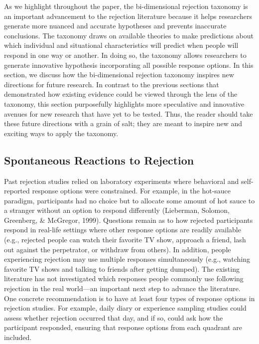 \documentclass[
]{udthesis}
\begin{document}
As we highlight throughout the paper, the bi-dimensional rejection
taxonomy is an important advancement to the rejection literature because
it helps researchers generate more nuanced and accurate hypotheses and
prevents inaccurate conclusions. The taxonomy draws on available
theories to make predictions about which individual and situational
characteristics will predict when people will respond in one way or
another. In doing so, the taxonomy allows researchers to generate
innovative hypothesis incorporating all possible response options. In
this section, we discuss how the bi-dimensional rejection taxonomy
inspires new directions for future research. In contrast to the previous
sections that demonstrated how existing evidence could be viewed through
the lens of the taxonomy, this section purposefully highlights more
speculative and innovative avenues for new research that have yet to be
tested. Thus, the reader should take these future directions with a
grain of salt; they are meant to inspire new and exciting ways to apply
the taxonomy.

\subsection{Spontaneous Reactions to Rejection}\label{spontaneous-reactions-to-rejection}

Past rejection studies relied on laboratory experiments where behavioral
and self-reported response options were constrained. For example, in the
hot-sauce paradigm, participants had no choice but to allocate some
amount of hot sauce to a stranger without an option to respond
differently (Lieberman, Solomon, Greenberg, \& McGregor, 1999). Questions
remain as to how rejected participants respond in real-life settings
where other response options are readily available (e.g., rejected
people can watch their favorite TV show, approach a friend, lash out
against the perpetrator, or withdraw from others). In addition, people
experiencing rejection may use multiple responses simultaneously (e.g.,
watching favorite TV shows and talking to friends after getting dumped).
The existing literature has not investigated which responses people
commonly use following rejection in the real world---an important next
step to advance the literature. One concrete recommendation is to have
at least four types of response options in rejection studies. For
example, daily diary or experience sampling studies could assess whether
rejection occurred that day, and if so, could ask how the participant
responded, ensuring that response options from each quadrant are
included.
\end{document}
